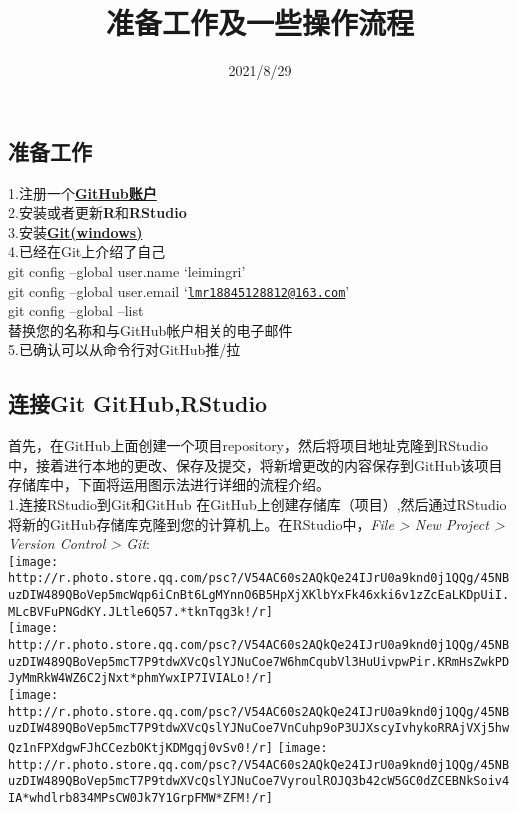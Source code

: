 \documentclass[
]{ctexart}
\title{准备工作及一些操作流程}
\author{}
\date{\vspace{-2.5em}2021/8/29}
\begin{document}
\maketitle

\hypertarget{ux51c6ux5907ux5de5ux4f5c}{%
\subsection{准备工作}\label{ux51c6ux5907ux5de5ux4f5c}}

1.注册一个\href{https://github.com}{\textbf{GitHub账户}}\\
2.安装或者更新\textbf{R}和\textbf{RStudio}\\
3.安装\href{https://gitforwindows.org/}{\textbf{Git(windows)}}\\
4.已经在Git上介绍了自己\\
git config --global user.name `leimingri'\\
git config --global user.email
`\href{mailto:lmr18845128812@163.com}{\nolinkurl{lmr18845128812@163.com}}'\\
git config --global --list\\
替换您的名称和与GitHub帐户相关的电子邮件\\
5.已确认可以从命令行对GitHub推/拉

\hypertarget{ux8fdeux63a5git-githubrstudio}{%
\subsection{连接Git
GitHub,RStudio}\label{ux8fdeux63a5git-githubrstudio}}

首先，在GitHub上面创建一个项目repository，然后将项目地址克隆到RStudio中，接着进行本地的更改、保存及提交，将新增更改的内容保存到GitHub该项目存储库中，下面将运用图示法进行详细的流程介绍。\\
1.连接RStudio到Git和GitHub
在GitHub上创建存储库（项目）,然后通过RStudio将新的GitHub存储库克隆到您的计算机上。在RStudio中，\emph{File
\textgreater{} New Project \textgreater{} Version Control \textgreater{}
Git}:\\
\texttt{[image: http://r.photo.store.qq.com/psc?/V54AC60s2AQkQe24IJrU0a9knd0j1QQg/45NBuzDIW489QBoVep5mcWqp6iCnBt6LgMYnnO6B5HpXjXKlbYxFk46xki6v1zZcEaLKDpUiI.MLcBVFuPNGdKY.JLtle6Q57.*tknTqg3k!/r]}\\
\texttt{[image: http://r.photo.store.qq.com/psc?/V54AC60s2AQkQe24IJrU0a9knd0j1QQg/45NBuzDIW489QBoVep5mcT7P9tdwXVcQslYJNuCoe7W6hmCqubVl3HuUivpwPir.KRmHsZwkPDJyMmRkW4WZ6C2jNxt*phmYwxIP7IVIALo!/r]}\\
\texttt{[image: http://r.photo.store.qq.com/psc?/V54AC60s2AQkQe24IJrU0a9knd0j1QQg/45NBuzDIW489QBoVep5mcT7P9tdwXVcQslYJNuCoe7VnCuhp9oP3UJXscyIvhykoRRAjVXj5hwQz1nFPXdgwFJhCCezbOKtjKDMgqj0vSv0!/r]}
\texttt{[image: http://r.photo.store.qq.com/psc?/V54AC60s2AQkQe24IJrU0a9knd0j1QQg/45NBuzDIW489QBoVep5mcT7P9tdwXVcQslYJNuCoe7VyroulROJQ3b42cW5GC0dZCEBNkSoiv4IA*whdlrb834MPsCW0Jk7Y1GrpFMW*ZFM!/r]}
\end{document}
